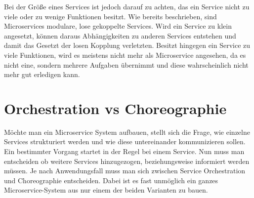 Bei der Größe eines Services ist jedoch darauf zu achten, das ein Service nicht zu viele oder zu wenige Funktionen besitzt. Wie bereits beschrieben, sind Microservices modulare, lose gekoppelte Services. Wird ein Service zu klein angesetzt, können daraus Abhängigkeiten zu anderen Services entstehen und damit das Gesetzt der losen Kopplung verletzten. Besitzt hingegen ein Service zu viele Funktionen, wird es meistens nicht mehr als Microservice angesehen, da es nicht eine, sondern mehrere Aufgaben übernimmt und diese wahrscheinlich nicht mehr gut erledigen kann.

\section{Orchestration vs Choreographie}
\label{sec:orchestrationvschoreographie}
Möchte man ein Microservice System aufbauen, stellt sich die Frage, wie einzelne Services strukturiert werden und wie diese untereinander kommunizieren sollen. Ein bestimmter Vorgang startet in der Regel bei einem Service. Nun muss man entscheiden ob weitere Services hinzugezogen, beziehungsweise informiert werden müssen.
Je nach Anwendungsfall muss man sich zwischen Service Orchestration und Choreographie entscheiden. Dabei ist es fast unmöglich ein ganzes Microservice-System aus nur einem der beiden Varianten zu bauen.

